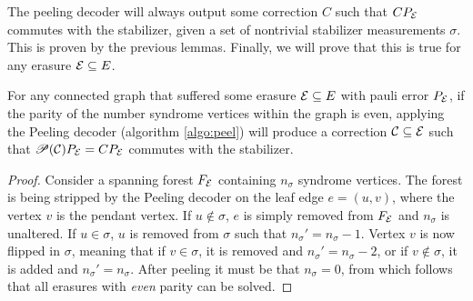 The peeling decoder will always output some correction $C$ such that $CP_{\mathcal{E}}$ commutes with the stabilizer, given a set of nontrivial stabilizer measurements $\sigma$. This is proven by the previous lemmas. Finally, we will prove that this is true for any erasure $\mathcal{E}\subseteq E$. 
\begin{theorem}\label{eq:anyevenparity}
  For any connected graph that suffered some erasure $\mathcal{E}\subseteq E$ with pauli error $P_{\mathcal{E}}$, if the parity of the number syndrome vertices within the graph is even, applying the Peeling decoder (algorithm \ref{algo:peel}) will produce a correction $\mathcal{C}\subseteq \mathcal{E}$ such that $\mathscr{P}(\mathcal{C})P_{\mathcal{E}}=CP_{\mathcal{E}}$ commutes with the stabilizer.
\end{theorem}
\begin{proof}
  Consider a spanning forest $F_{\mathcal{E}}$ containing $n_\sigma$ syndrome vertices. The forest is being stripped by the Peeling decoder on the leaf edge $e = (u,v)$, where the vertex $v$ is the pendant vertex. If $u\notin\sigma$, $e$ is simply removed from $F_{\mathcal{E}}$ and $n_\sigma$ is unaltered. If $u\in\sigma$, $u$ is removed from $\sigma$ such that $n_\sigma'= n_\sigma -1$. Vertex $v$ is now flipped in $\sigma$, meaning that if $v\in\sigma$, it is removed and $n_\sigma'= n_\sigma -2$, or if  $v\notin\sigma$, it is added and $n_\sigma'= n_\sigma$. After peeling it must be that $n_\sigma=0$, from which follows that all erasures with \emph{even} parity can be solved. 
\end{proof}

